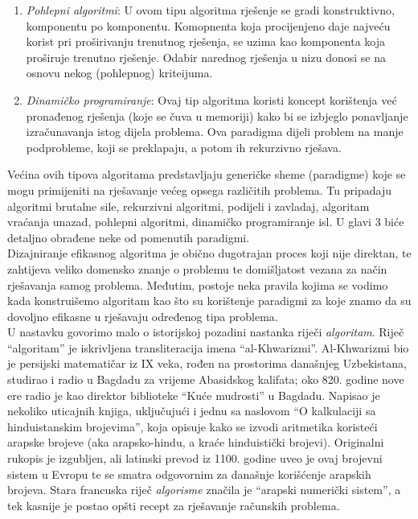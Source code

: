 \begin{enumerate}
    \item \textit{Pohlepni algoritmi}: U ovom tipu algoritma rješenje se gradi konstruktivno, komponentu po komponentu.   Komopnenta koja procijenjeno daje najveću korist pri proširivanju trenutnog rješenja, se uzima kao komponenta koja  proširuje trenutno  rješenje. Odabir  narednog rješenja u nizu donosi se na osnovu nekog (pohlepnog) kriteijuma.
    \item \textit{Dinamičko programiranje}: Ovaj tip algoritma koristi koncept korištenja već pronađenog rješenja (koje se čuva u memoriji) kako bi se izbjeglo ponavljanje izračunavanja istog dijela problema. Ova paradigma dijeli problem na manje podprobleme, koji se preklapaju, a potom ih rekurzivno rješava.
\end{enumerate}
   
   Većina ovih tipova algoritama predstavljaju generičke sheme (paradigme) koje se mogu primijeniti na  rješavanje većeg opsega različitih problema. Tu pripadaju algoritmi brutalne sile, rekurzivni algoritmi, podijeli i zavladaj, algoritam vraćanja unazad, pohlepni algoritmi, dinamičko programiranje isl. U glavi 3 biće detaljno obrađene  neke od pomenutih paradigmi. \\
  
Dizajniranje efikasnog algoritma je obično dugotrajan proces koji nije direktan, te zahtijeva veliko domensko znanje o problemu te domišljatost vezana za način rješavanja samog  problema.  Međutim, postoje neka pravila kojima se vodimo kada konstruišemo algoritam kao što su korištenje paradigmi za koje znamo da su dovoljno efikasne u rješavaju određenog tipa problema. 
 \\ 
 
 U nastavku govorimo malo o istorijskoj pozadini nastanka riječi \textit{algoritam}. Riječ ``algoritam'' je iskrivljena transliteracija imena ``al-Khwarizmi''. Al-Khwarizmi bio je persijski matematičar iz IX veka, rođen na prostorima današnjeg Uzbekistana, studirao i radio u Bagdadu za vrijeme Abasidskog kalifata; oko 820. godine nove ere radio je kao 
  direktor biblioteke ``Kuće mudrosti'' u Bagdadu. Napisao je nekoliko
 uticajnih knjiga, uključujući i jednu sa naslovom ``O kalkulaciji sa hinduistanskim brojevima'', koja opisuje kako se izvodi aritmetika koristeći arapske brojeve (aka arapsko-hindu, a kraće hinduistički brojevi). Originalni rukopis je izgubljen, ali latinski prevod iz 
 1100. godine uveo je ovaj brojevni sistem u Evropu te se smatra odgovornim  za današnje korišćenje  arapskih brojeva.   Stara francuska riječ \textit{algorisme} značila je
 ``arapski numerički sistem'', a tek kasnije je postao opšti recept za rješavanje računskih problema.

